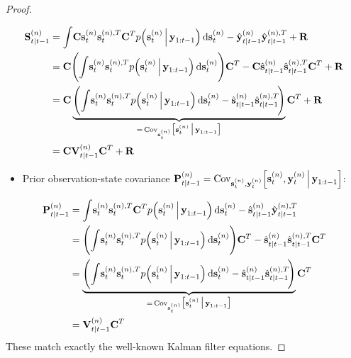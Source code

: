\begin{proof}
\begin{itemize}
		\end{itemize}
		\begin{align*}
			\mat{S}_{t \subgiven t - 1}^{(n)}
				&= \int\! \mat{C} \vec{s}_t^{(n)} \vec{s}_t^{(n), T} \mat{C}^T p\Big(\vec{s}_t^{(n)} \Biggiven \vec{y}_{1:t - 1}\Big) \dd{\vec{s}_t^{(n)}} - \hat{\vec{y}}_{t \subgiven t - 1}^{(n)} \hat{\vec{y}}_{t \subgiven t - 1}^{(n), T} + \mat{R} \\
				&= \mat{C} \Bigg(\! \int\! \vec{s}_t^{(n)} \vec{s}_t^{(n), T} p\Big(\vec{s}_t^{(n)} \Biggiven \vec{y}_{1:t - 1}\Big) \dd{\vec{s}_t^{(n)}} \!\Bigg) \mat{C}^T - \mat{C} \hat{\vec{s}}_{t \subgiven t - 1}^{(n)} \hat{\vec{s}}_{t \subgiven t - 1}^{(n), T} \mat{C}^T + \mat{R} \\
				&= \mat{C} \underbrace{\Bigg(\! \int\! \vec{s}_t^{(n)} \vec{s}_t^{(n), T} p\Big(\vec{s}_t^{(n)} \Biggiven \vec{y}_{1:t - 1}\Big) \dd{\vec{s}_t^{(n)}} - \hat{\vec{s}}_{t \subgiven t - 1}^{(n)} \hat{\vec{s}}_{t \subgiven t - 1}^{(n), T} \!\Bigg)}_{=\, \Cov_{\vec{s}_t^{(n)}}\!\big[\vec{s}_t^{(n)} \biggiven \vec{y}_{1:t - 1}\big]} \mat{C}^T + \mat{R} \\
				&= \mat{C} \mat{V}_{t \subgiven t - 1}^{(n)} \mat{C}^T + \mat{R}
		\end{align*}
		\begin{itemize}
			\item Prior observation-state covariance \( \boldsymbol{\mathrm{P}}_{t \vert t - 1}^{(n)} = \operatorname{Cov}_{\boldsymbol{\mathrm{s}}_t^{(n)}, \boldsymbol{\mathrm{y}}_t^{(n)}}\!\Big[\boldsymbol{\mathrm{s}}_t^{(n)}, \boldsymbol{\mathrm{y}}_t^{(n)} \,\Big\vert\, \boldsymbol{\mathrm{y}}_{1:t - 1}\Big] \):
		\end{itemize}
		\begin{align*}
			\mat{P}_{t \subgiven t - 1}^{(n)}
				&= \int\! \vec{s}_t^{(n)} \vec{s}_t^{(n), T} \mat{C}^T p\Big(\vec{s}_t^{(n)} \Biggiven \vec{y}_{1:t - 1}\Big) \dd{\vec{s}_t^{(n)}} - \hat{\vec{s}}_{t \subgiven t - 1}^{(n)} \hat{\vec{y}}_{t \subgiven t - 1}^{(n), T} \\
				&= \Bigg(\! \int\! \vec{s}_t^{(n)} \vec{s}_t^{(n), T} p\Big(\vec{s}_t^{(n)} \Biggiven \vec{y}_{1:t - 1}\Big) \dd{\vec{s}_t^{(n)}} \!\Bigg) \mat{C}^T - \hat{\vec{s}}_{t \subgiven t - 1}^{(n)} \hat{\vec{s}}_{t \subgiven t - 1}^{(n), T} \mat{C}^T \\
				&= \underbrace{\Bigg(\! \int\! \vec{s}_t^{(n)} \vec{s}_t^{(n), T} p\Big(\vec{s}_t^{(n)} \Biggiven \vec{y}_{1:t - 1}\Big) \dd{\vec{s}_t^{(n)}} - \hat{\vec{s}}_{t \subgiven t - 1}^{(n)} \hat{\vec{s}}_{t \subgiven t - 1}^{(n), T} \!\Bigg)}_{=\, \Cov_{\vec{s}_t^{(n)}}\!\big[\vec{s}_t^{(n)} \biggiven \vec{y}_{1:t - 1}\big]} \mat{C}^T \\
				&= \mat{V}_{t \subgiven t - 1}^{(n)} \mat{C}^T
		\end{align*}
		These match exactly the well-known Kalman filter equations.


\end{proof}
